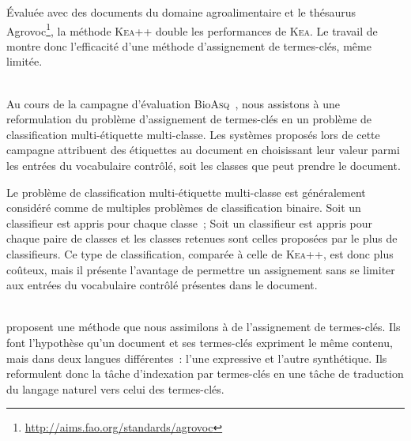     Évaluée avec des documents du domaine agroalimentaire et le thésaurus
    Agrovoc\footnote{\url{http://aims.fao.org/standards/agrovoc}},
    la méthode \textsc{Kea}++ double les performances de \textsc{Kea}. Le travail de
     montre donc l'efficacité d'une méthode
    d'assignement de termes-clés, même limitée.

    ~\\Au cours de la campagne d'évaluation
    Bio\textsc{Asq}~\cite{partalas2013bioasq}, nous assistons à une
    reformulation du problème d'assignement de termes-clés en un problème de
    classification multi-étiquette multi-classe. Les systèmes proposés lors de
    cette campagne attribuent des étiquettes au document en choisissant leur
    valeur parmi les entrées du vocabulaire contrôlé, soit les classes que peut
    prendre le document.

    Le problème de classification multi-étiquette multi-classe est généralement
    considéré comme de multiples problèmes de classification binaire. Soit un
    classifieur est appris pour chaque classe~; Soit un classifieur est appris
    pour chaque paire de classes et les classes retenues sont celles proposées
    par le plus de classifieurs. Ce type de classification, comparée à celle de
    \textsc{Kea}++, est donc plus coûteux, mais il présente l'avantage de
    permettre un assignement sans se limiter aux entrées du vocabulaire contrôlé
    présentes dans le document.

    ~\\ proposent une méthode que nous assimilons
    à de l'assignement de termes-clés. Ils font l'hypothèse qu'un document et
    ses termes-clés expriment le même contenu, mais dans deux langues
    différentes~: l'une expressive et l'autre synthétique. Ils reformulent donc
    la tâche d'indexation par termes-clés en une tâche de traduction du langage
    naturel vers celui des termes-clés.
    
